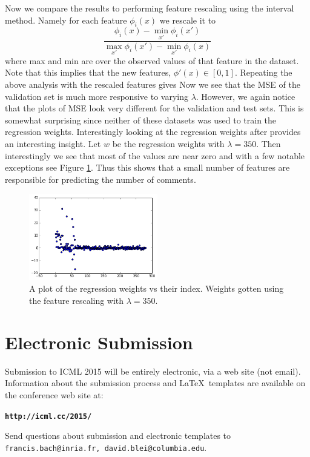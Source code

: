 \documentclass{article}
\begin{document}
%
%

Now we compare the results to performing feature rescaling using the interval method. Namely for each feature $\phi_i(x)$ we rescale it to 
%
%
%
\begin{equation*}
\frac{\phi_i(x) - \min_{x'}\phi_i(x')}{\max_{x'}\phi_i(x') - \min_{x'}\phi_i(x)}
\end{equation*}
 where max and min are over the observed values of that feature in the dataset. Note that this implies that the new features, $\phi'(x) \in [0,1]$.  Repeating the above analysis with the rescaled features gives
 Now we see that the MSE of the validation set is much more responsive to varying $\lambda$. However, we again notice that the plots of MSE look very different for the validation and test sets. This is somewhat surprising since neither of these datasets was used to train the regression weights. Interestingly looking at the regression weights after provides an interesting insight. Let $w$ be the regression weights with $\lambda = 350$. Then interestingly we see that most of the values are near zero and with a few notable exceptions see Figure \ref{reg-weights-lam-350-normalize-true}. Thus this shows that a small number of features are responsible for predicting the number of comments.

 \begin{figure}[h]
\centering
\includegraphics[width=0.5\textwidth]{reg-weights-lam-350-normalize-true}
\caption{A plot of the regression weights vs their index. Weights gotten using the feature rescaling with $\lambda = 350$. }
\label{reg-weights-lam-350-normalize-true}
\end{figure}


\section{Electronic Submission}
\label{submission}

Submission to ICML 2015 will be entirely electronic, via a web site
(not email).  Information about the submission process and \LaTeX\ templates
are available on the conference web site at:
\begin{center}
\textbf{\texttt{http://icml.cc/2015/}}
\end{center}
Send questions about submission and electronic templates to
\texttt{francis.bach@inria.fr, david.blei@columbia.edu}.
\end{document}
